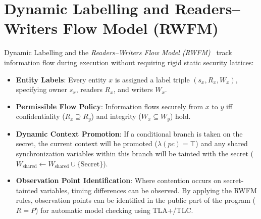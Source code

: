 \documentclass[a4paper,12pt]{report}
\begin{document}
\section{Dynamic Labelling and Readers--Writers Flow Model (RWFM)}
Dynamic Labelling and the \emph{Readers--Writers Flow Model (RWFM)}~\cite{ghosal2018secrypt,ghosal2020dbsec} track information flow during execution without requiring rigid static security lattices:
\begin{itemize}[itemsep=0.2em, topsep=0.15em]
    \item \textbf{Entity Labels}: Every entity $x$ is assigned a label triple $(s_x, R_x, W_x)$, specifying owner $s_x$, readers $R_x$, and writers $W_x$.
    \item \textbf{Permissible Flow Policy}: Information flows securely from $x$ to $y$ iff confidentiality ($R_x \supseteq R_y$) and integrity ($W_x \subseteq W_y$) hold.
    \item \textbf{Dynamic Context Promotion}: If a conditional branch is taken on the secret, the current context will be promoted ($\lambda(pc) = \top$) and any shared synchronization variables within this branch will be tainted with the secret ($W_{\text{shared}} \leftarrow W_{\text{shared}} \cup \{\text{Secret}\}$).
    \item \textbf{Observation Point Identification}: Where contention occurs on secret-tainted variables, timing differences can be observed. By applying the RWFM rules, observation points can be identified in the public part of the program ($R = P$) for automatic model checking using TLA+\slash TLC.
\end{itemize}
\end{document}
